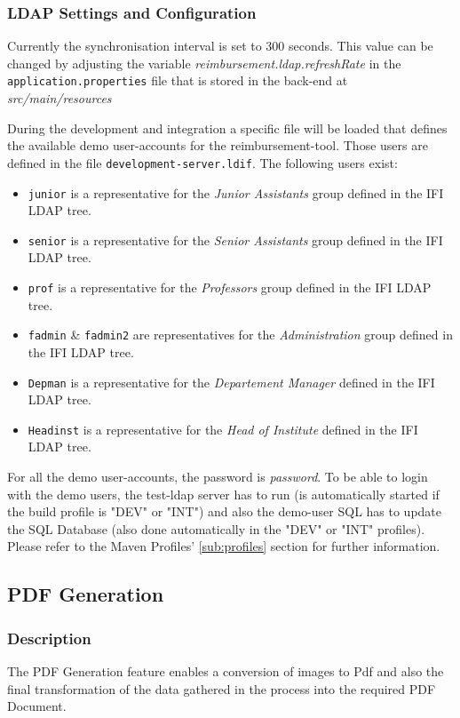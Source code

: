 \subsubsection{LDAP Settings and Configuration}
\label{subsubsec:ldap}

Currently the synchronisation interval is set to 300 seconds. This value can be changed by adjusting the variable \textit{reimbursement.ldap.refreshRate} in the \texttt{application.properties} file that is stored in the back-end at \textit{src/main/resources} \par
During the development and integration a specific file will be loaded that defines the available demo user-accounts for the reimbursement-tool. Those users are defined in the file \texttt{development-server.ldif}. The following users exist:
\begin{itemize}
	\item \texttt{junior} is a representative for the \textit{Junior Assistants} group defined in the IFI LDAP tree.
	\item \texttt{senior} is a representative for the \textit{Senior Assistants} group defined in the IFI LDAP tree.
	\item \texttt{prof} is a representative for the \textit{Professors} group defined in the IFI LDAP tree.
	\item \texttt{fadmin} \& \texttt{fadmin2} are representatives for the \textit{Administration} group defined in the IFI LDAP tree.
	\item \texttt{Depman} is a representative for the \textit{Departement Manager} defined in the IFI LDAP tree.
	\item \texttt{Headinst} is a representative for the \textit{Head of Institute} defined in the IFI LDAP tree.
	
\end{itemize}

For all the demo user-accounts, the password is \textit{password}. To be able to login with the demo users, the test-ldap server has to run (is automatically started if the build profile is "DEV" or "INT") and also the demo-user SQL has to update the SQL Database (also done automatically in the "DEV" or "INT" profiles). Please refer to the Maven Profiles' \ref{sub:profiles} section for further information.

\subsection{PDF Generation}
\subsubsection{Description}
The PDF Generation feature enables a conversion of images to Pdf and also the final transformation of the data gathered in the process into the required PDF Document.

